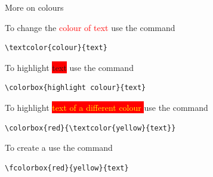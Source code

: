 \documentclass[12pt, aspectratio=169, xcolor=pdftex]{beamer}
\begin{document}
\begin{frame}[fragile]{More on colours}

To change the \textcolor{red}{colour of text} use the command

\begin{verbatim}
\textcolor{colour}{text}
\end{verbatim}

To highlight \colorbox{red}{text} use the command
\begin{verbatim}
\colorbox{highlight colour}{text}
\end{verbatim}


To highlight 
\colorbox{red}{\textcolor{yellow}{text of a different colour} }
use the command

\begin{verbatim}\colorbox{red}{\textcolor{yellow}{text}}
\end{verbatim}


To create a 
use the command

\begin{verbatim}\fcolorbox{red}{yellow}{text}
\end{verbatim} %

\end{frame}
\end{document}
